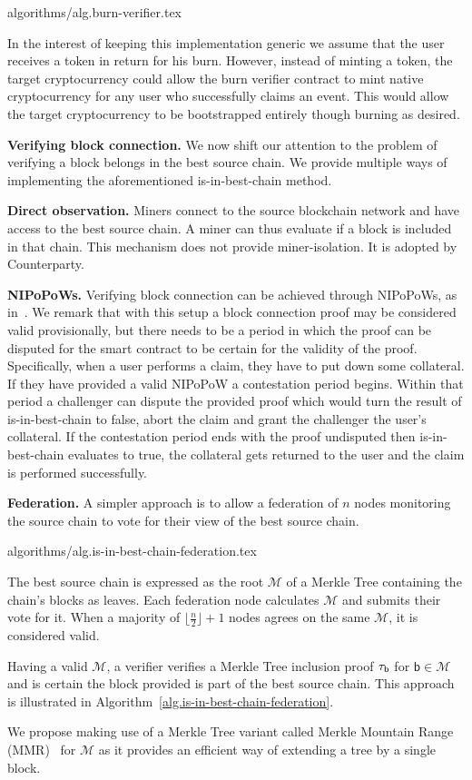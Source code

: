 {algorithms/alg.burn-verifier.tex}

In the interest of keeping this implementation generic we assume that the user receives a token in return for his burn. However, instead of minting a token, the target cryptocurrency could allow the burn verifier contract to mint native cryptocurrency for any user who successfully claims an event. This would allow the target cryptocurrency to be bootstrapped entirely though burning as desired.

\noindent
\textbf{Verifying block connection.}
We now shift our attention to the problem of verifying a block belongs in the best source chain. We provide multiple ways of implementing the aforementioned \textsf{is-in-best-chain} method.

\noindent
\textbf{Direct observation.}
Miners connect to the source blockchain network and have access to the best source chain. A miner can thus evaluate if a block is included in that chain. This mechanism does not provide miner-isolation. It is adopted by Counterparty.

\noindent
\textbf{NIPoPoWs.}
Verifying block connection can be achieved through NIPoPoWs, as in~\cite{pow-sidechains}.
We remark that with this setup a block connection proof may be considered valid provisionally, but there needs to be a period in which the proof can be disputed for the smart contract to be certain for the validity of the proof. Specifically, when a user performs a claim, they have to put down some collateral. If they have provided a valid NIPoPoW a contestation period begins. Within that period a challenger can dispute the provided proof which would turn the result of \textsf{is-in-best-chain} to false, abort the claim and grant the challenger the user's collateral. If the contestation period ends with the proof undisputed then \textsf{is-in-best-chain} evaluates to true, the collateral gets returned to the user and the claim is performed successfully.

\noindent
\textbf{Federation.}
A simpler approach is to allow a federation of $n$ nodes monitoring the source chain to vote for their view of the best source chain.

{algorithms/alg.is-in-best-chain-federation.tex}

The best source chain is expressed as the root $\mathcal{M}$ of a Merkle Tree containing the chain's blocks as leaves. Each federation node calculates $\mathcal{M}$ and submits their vote for it. When a majority of $\lfloor\frac{n}{2}\rfloor + 1$ nodes agrees on the same $\mathcal{M}$, it is considered valid.

Having a valid $\mathcal{M}$, a verifier verifies a Merkle Tree inclusion proof $\tau_\textsf{b}$ for $\textsf{b} \in \mathcal{M}$ and is certain the block provided is part of the best source chain. This approach is illustrated in Algorithm~\ref{alg.is-in-best-chain-federation}.

We propose making use of a Merkle Tree variant called Merkle Mountain Range (MMR)~\cite{flyclient} for $\mathcal{M}$ as it provides an efficient way of extending a tree by a single block.
